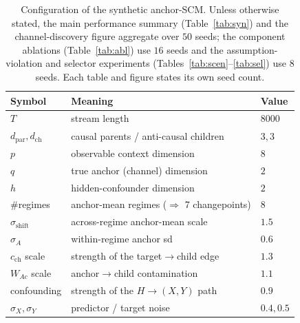 \documentclass[11pt]{article}
\theoremstyle{plain}
\theoremstyle{remark}
\begin{document}
\begin{table}[htbp]
\centering
\caption{Configuration of the synthetic anchor-SCM. Unless otherwise stated, the
main performance summary (Table~\ref{tab:syn}) and the channel-discovery figure
aggregate over $50$ seeds; the component ablations (Table~\ref{tab:abl}) use $16$
seeds and the assumption-violation and selector experiments
(Tables~\ref{tab:scen}--\ref{tab:sel}) use $8$ seeds. Each table and figure states
its own seed count.}
\label{tab:scm}
\small
\begin{tabular}{lll}
\toprule
Symbol & Meaning & Value\\
\midrule
$T$ & stream length & $8000$\\
$d_{\mathrm{par}},d_{\mathrm{ch}}$ & causal parents / anti-causal children & $3,3$\\
$p$ & observable context dimension & $8$\\
$q$ & true anchor (channel) dimension & $2$\\
$h$ & hidden-confounder dimension & $2$\\
\#regimes & anchor-mean regimes ($\Rightarrow$ 7 changepoints) & $8$\\
$\sigma_{\text{shift}}$ & across-regime anchor-mean scale & $1.5$\\
$\sigma_A$ & within-regime anchor sd & $0.6$\\
$c_{\mathrm{ch}}$ scale & strength of the target$\to$child edge & $1.3$\\
$W_{Ac}$ scale & anchor$\to$child contamination & $1.1$\\
confounding & strength of the $H\to(X,Y)$ path & $0.9$\\
$\sigma_X,\sigma_Y$ & predictor / target noise & $0.4,0.5$\\
\bottomrule
\end{tabular}
\end{table}
\end{document}
